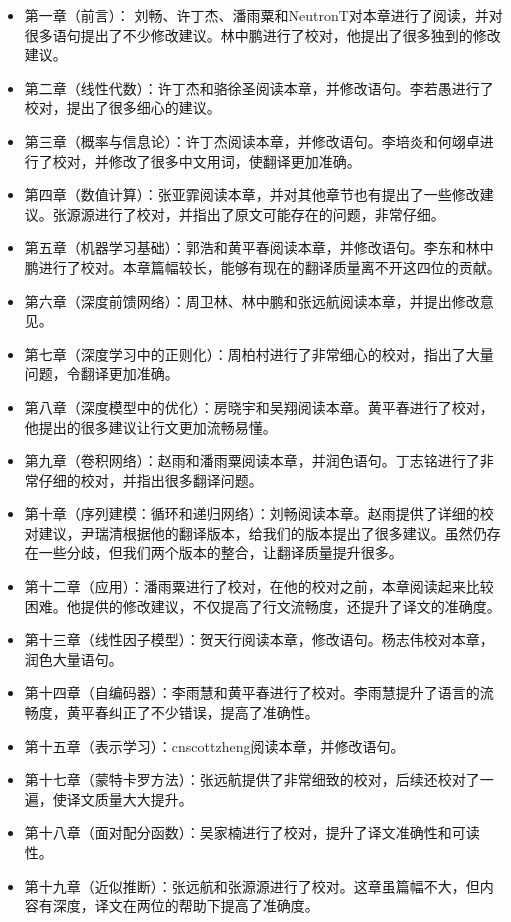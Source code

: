 \begin{itemize}
\item  第一章（前言）： 刘畅、许丁杰、潘雨粟和NeutronT对本章进行了阅读，并对很多语句提出了不少修改建议。林中鹏进行了校对，他提出了很多独到的修改建议。
\item  第二章（线性代数）：许丁杰和骆徐圣阅读本章，并修改语句。李若愚进行了校对，提出了很多细心的建议。
\item  第三章（概率与信息论）：许丁杰阅读本章，并修改语句。李培炎和何翊卓进行了校对，并修改了很多中文用词，使翻译更加准确。
\item  第四章（数值计算）：张亚霏阅读本章，并对其他章节也有提出了一些修改建议。张源源进行了校对，并指出了原文可能存在的问题，非常仔细。
\item  第五章（机器学习基础）：郭浩和黄平春阅读本章，并修改语句。李东和林中鹏进行了校对。本章篇幅较长，能够有现在的翻译质量离不开这四位的贡献。
\item  第六章（深度前馈网络）：周卫林、林中鹏和张远航阅读本章，并提出修改意见。
\item  第七章（深度学习中的正则化）：周柏村进行了非常细心的校对，指出了大量问题，令翻译更加准确。
\item  第八章（深度模型中的优化）：房晓宇和吴翔阅读本章。黄平春进行了校对，他提出的很多建议让行文更加流畅易懂。
\item  第九章（卷积网络）：赵雨和潘雨粟阅读本章，并润色语句。丁志铭进行了非常仔细的校对，并指出很多翻译问题。
\item  第十章（序列建模：循环和递归网络）：刘畅阅读本章。赵雨提供了详细的校对建议，尹瑞清根据他的翻译版本，给我们的版本提出了很多建议。虽然仍存在一些分歧，但我们两个版本的整合，让翻译质量提升很多。
\item  第十二章（应用）：潘雨粟进行了校对，在他的校对之前，本章阅读起来比较困难。他提供的修改建议，不仅提高了行文流畅度，还提升了译文的准确度。
\item  第十三章（线性因子模型）：贺天行阅读本章，修改语句。杨志伟校对本章，润色大量语句。
\item  第十四章（自编码器）：李雨慧和黄平春进行了校对。李雨慧提升了语言的流畅度，黄平春纠正了不少错误，提高了准确性。
\item  第十五章（表示学习）：cnscottzheng阅读本章，并修改语句。
\item  第十七章（蒙特卡罗方法）：张远航提供了非常细致的校对，后续还校对了一遍，使译文质量大大提升。
\item  第十八章（面对配分函数）：吴家楠进行了校对，提升了译文准确性和可读性。
\item  第十九章（近似推断）：张远航和张源源进行了校对。这章虽篇幅不大，但内容有深度，译文在两位的帮助下提高了准确度。
\end{itemize}

